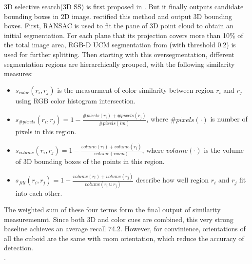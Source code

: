 \documentclass[english]{ccdconf}
\begin{document}
3D selective search(3D SS) is first  proposed in \cite{kanezaki20153d}. But it finally outputs candidate bounding boxes in 2D image. \cite{song2016deep} rectified this method and output 3D bounding boxes. First, RANSAC is used to fit the pane of 3D point cloud to obtain an initial segmentation. For each plane that its projection covers more than 10\% of the total image area,
RGB-D UCM segmentation from \cite{gupta2014learning}(with threshold 0.2) is used for further splitting. Then starting with this oversegmentation, different segmentation regions are hierarchically grouped, with the following similarity measures:
\begin{itemize}
\item $s_{color}(r_i,r_j)$ is the measurment of color similarity between region $r_i$ and $r_j$ using RGB color histogram intersection.
\item $s_{\#pixels}(r_i,r_j)=1-\frac{\#pixels(r_i)+\#pixels(r_j)}{\#pixels(im)}$, where $\#pixels(\cdot)$ is number of pixels in this region.
\item
$s_{volume}(r_i,r_j)=1-\frac{volume(r_i)+volume(r_j)}{volume(room)}$, where $volume(\cdot)$ is the volume of 3D bounding boxes of the points in this region.
\item
$s_{fill}(r_i,r_j)=1-\frac{volume(r_i)+volume(r_j)}{volume(r_i \cup r_j)}$ describe how well region $r_i$ and $r_j$ fit into each other.
\end{itemize}
The weighted sum of these four terms form the final output of similarity measuremenmt. Since both 3D and color cues are combined,
this very strong baseline achieves an average recall 74.2. However, for convinience, orientations of all the cuboid are the same with room orientation, which reduce the accuracy of detection.\\.
\end{document}
